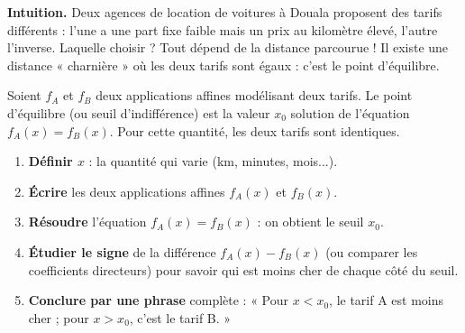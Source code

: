 \documentclass[11pt]{article}
\newcommand{\cle}[1]{{\popxbold\color{popdark}#1}}
\begin{document}
\textbf{Intuition.} Deux agences de location de voitures à Douala proposent des tarifs différents : l'une a une part fixe faible mais un prix au kilomètre élevé, l'autre l'inverse. Laquelle choisir ? Tout dépend de la distance parcourue ! Il existe une distance « charnière » où les deux tarifs sont égaux : c'est le \cle{point d'équilibre}.

\begin{definition}
Soient $f_A$ et $f_B$ deux applications affines modélisant deux tarifs. Le \cle{point d'équilibre} (ou seuil d'indifférence) est la valeur $x_0$ solution de l'équation $f_A(x) = f_B(x)$. Pour cette quantité, les deux tarifs sont identiques.
\end{definition}

\begin{methode}
\begin{enumerate}
\item \textbf{Définir $x$} : la quantité qui varie (km, minutes, mois...).
\item \textbf{Écrire} les deux applications affines $f_A(x)$ et $f_B(x)$.
\item \textbf{Résoudre} l'équation $f_A(x) = f_B(x)$ : on obtient le seuil $x_0$.
\item \textbf{Étudier le signe} de la différence $f_A(x) - f_B(x)$ (ou comparer les coefficients directeurs) pour savoir qui est moins cher de chaque côté du seuil.
\item \textbf{Conclure par une phrase} complète : « Pour $x < x_0$, le tarif A est moins cher ; pour $x > x_0$, c'est le tarif B. »
\end{enumerate}
\end{methode}
\end{document}
